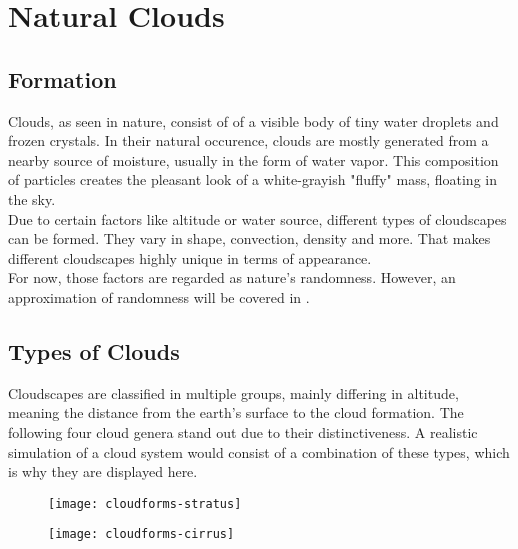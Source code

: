 \section{Natural Clouds}

\subsection{Formation}
Clouds, as seen in nature, consist of of a visible body of tiny water droplets and frozen crystals. 
In their natural occurence, clouds are mostly generated from a nearby source of moisture, usually in the form of water vapor. 
This composition of particles creates the pleasant look of a white-grayish "fluffy" mass, floating in the sky.
\\
Due to certain factors like altitude or water source, different types of cloudscapes can be formed. They vary in shape, \gls{convection}, density and more.
That makes different cloudscapes highly unique in terms of appearance.
\\
For now, those factors are regarded as nature's randomness. However, an approximation of randomness will be covered in .


\subsection{Types of Clouds}
\label{section:cloud-types}
Cloudscapes are classified in multiple groups, mainly differing in altitude, meaning the distance from the earth's surface to the cloud formation.
The following four cloud genera stand out due to their distinctiveness. A realistic simulation of a cloud system would consist of a combination of these types, which is why they are displayed here.
\begin{figure}[ht]
    \centering
        \begin{minipage}{0.47\linewidth}
            \texttt{[image: cloudforms-stratus]}
            \label{img:photo:cloudforms-stratus}        
        \end{minipage}        
    \hfill
        \begin{minipage}{0.47\linewidth}
            \texttt{[image: cloudforms-cirrus]}
            \label{img:photo:cloudforms-cirrus}        
        \end{minipage}
\end{figure}

